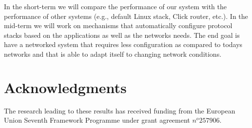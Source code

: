 \documentclass{sig-alternate}
\begin{document}
In the short-term we will compare the performance of our system with the performance of other systems (e.g., default Linux stack, Click router, etc.). 
In the mid-term we will work on mechanisms that automatically configure protocol stacks based on the applications as well as the networks needs. 
The end goal is have a networked system that requires less configuration as compared to todays networks and that is able to adapt itself to changing network conditions.   





\section{Acknowledgments}
The research leading to these results has received funding from the European Union Seventh Framework Programme under grant agreement $n^o 257906$.
%

%
%
\end{document}
